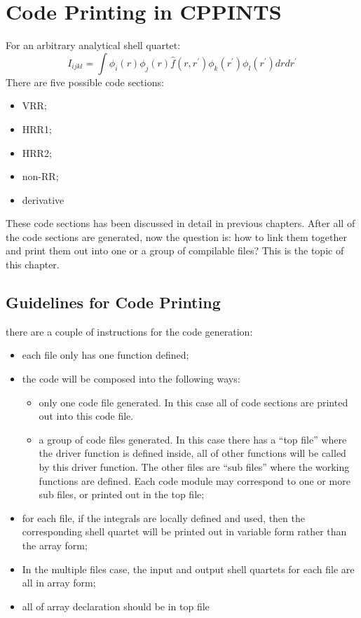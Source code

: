 


\chapter{Code Printing in CPPINTS}

For an arbitrary analytical shell quartet:
\begin{equation}
 I_{ijkl} = \int \phi_{i}(r)\phi_{j}(r)\hat{f}(r,r^{'})\phi_{k}(r^{'})\phi_{l}(r^{'}) dr dr^{'}
\end{equation}
There are five possible code sections:
\begin{itemize}
 \item VRR;
 \item HRR1;
 \item HRR2;
 \item non-RR;
 \item derivative
\end{itemize}
These code sections has been discussed in detail in previous chapters. After all of 
the code sections are generated, now the question is: how to link them together 
and print them out into one or a group of compilable files? This is the topic
of this chapter.

\section{Guidelines for Code Printing}
\label{code_generation_guide}

there are a couple of instructions for the code generation:
\begin{itemize}
 \item each file only has one function defined;
 \item the code will be composed into the following ways:
 \begin{itemize}
  \item only one code file generated. In this case all of code sections are 
  printed out into this code file.
  \item a group of code files generated. In this case there has a ``top file''
  where the driver function is defined inside, all of other functions will be 
  called by this driver function. The other files are ``sub files'' where
  the working functions are defined. Each code module may correspond to one 
  or more sub files, or printed out in the top file;
 \end{itemize}
 \item for each file, if the integrals are locally defined and used, then the 
 corresponding shell quartet will be printed out in variable form rather 
 than the array form;
 \item In the multiple files case, the input and output shell quartets for 
 each file are all in array form;
 \item all of array declaration should be in top file
\end{itemize}

